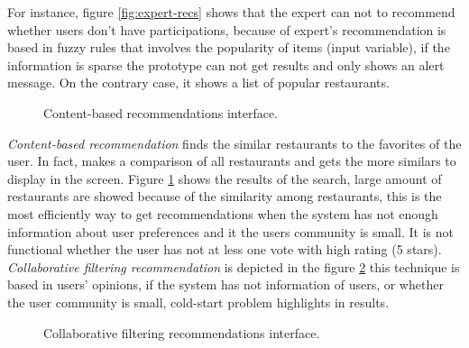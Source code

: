 For instance, figure \ref{fig:expert-recs} shows that the expert can 
not to recommend
whether users don’t have participations, because of expert's
recommendation is based in fuzzy rules that involves the popularity of
items (input variable), if the information is sparse the prototype can
not get results and only shows an alert message. On the contrary case,
it shows a list of popular restaurants.\\ 
\begin{figure}
\captionsetup{font=footnotesize}
\centering
{}
\caption{Content-based recommendations interface.}
\label{fig:base-content}   
\end{figure}
\textit{Content-based recommendation} finds the similar restaurants to the
favorites of the user. In fact, makes a comparison of all restaurants
and gets the more similars to display in the screen. 
Figure \ref{fig:base-content}  
shows the results of the search, large amount of restaurants are showed
because of the similarity among restaurants, this is the most
efficiently way to get recommendations when the system has not enough
information about user preferences and it the users community is
small. It is not functional whether the user has not at less one vote
with high rating (5 stars).\\ 
\textit{Collaborative filtering recommendation} is depicted in the 
figure \ref{fig:cf-recs}
this technique is based in users' opinions, if the system has not
information of users, or whether the user community is small, 
cold-start problem highlights in results. 
\begin{figure}
\captionsetup{font=footnotesize}
\centering
{}
\caption{Collaborative filtering recommendations interface.}
\label{fig:cf-recs}   
\end{figure}

